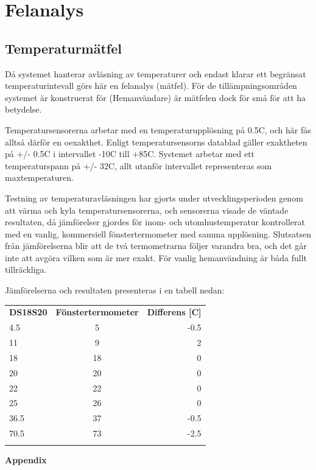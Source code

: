 \documentclass[a4paper,11pt]{article}
\begin{document}
\section{Felanalys}

\subsection{Temperaturmätfel}

Då systemet hanterar avläsning av temperaturer och endast klarar ett begränsat temperaturintevall
görs här en felanalys (mätfel). För de tillämpningsområden systemet är konstruerat för (Hemanvändare) 
är mätfelen dock för små för att ha betydelse.

Temperatursensorerna arbetar med en temperaturupplösning på 0.5C, och här fås alltså därför en oexakthet.
Enligt temperatursensorns datablad gäller exaktheten på +/- 0.5C i intervallet -10C till +85C.
Systemet arbetar med ett temperaturspann på +/- 32C, allt utanför intervallet representeras som maxtemperaturen.

Testning av temperaturavläsningen har gjorts under utvecklingsperioden genom att värma och kyla temperatursensorerna,
och sensorerna visade de väntade resultaten, då jämförelser gjordes för inom- och utomhustemperatur kontrollerat med
en vanlig, kommersiell fönstertermometer med samma upplösning. Slutsatsen från jämförelserna blir att de två 
termometrarna följer varandra bra, och det går inte att avgöra vilken som är mer exakt. För vanlig hemanvändning
är båda fullt tillräckliga.

Jämförelserna och resultaten presenteras i en tabell nedan: 

	\begin{tabular}{l c r}
		\\{\bf DS18S20} & {\bf Fönstertermometer} & {\bf Differens [C]}\\
		4.5 & 5 & -0.5\\		
		11 & 9 & 2\\		
		18 & 18 & 0\\
		20 & 20 & 0\\	
		22 & 22 & 0\\
		25 & 26 & 0\\		
		36.5 & 37 & -0.5\\
		70.5 & 73 & -2.5 \\\\
	\end{tabular}

\pagebreak
{\bf \huge Appendix}
\end{document}
